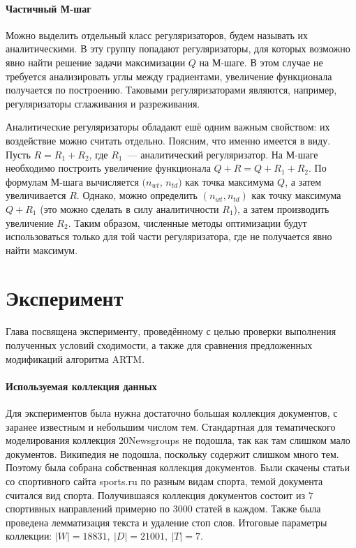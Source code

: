 \documentclass[12pt, twoside]{article}
\begin{document}
\paragraph{Частичный М-шаг}
Можно выделить отдельный класс регуляризаторов, будем называть их аналитическими. В эту группу попадают регуляризаторы, для которых возможно явно найти решение  задачи  максимизации  $Q$ на М-шаге. В этом случае не требуется анализировать углы между градиентами, увеличение функционала получается по построению. Таковыми регуляризаторами являются, например, регуляризаторы сглаживания и разреживания. 

Аналитические регуляризаторы  обладают ешё одним важным свойством: их воздействие можно считать отдельно. Поясним, что именно имеется в виду. Пусть $R = R_1 + R_2$, где $R_1$~--- аналитический регуляризатор. На М-шаге необходимо построить увеличение функционала $Q + R = Q +  R_1 +  R_2$. По формулам М-шага вычисляется $(n_{wt}$, $n_{td})$ как точка максимума $Q$, а затем увеличивается $R$.  Однако, можно определить $(n_{wt},n_{td})$ как точку максимума $Q + R_1 $ (это можно сделать в силу аналитичности $R_1$), а затем производить увеличение $R_2$. Таким образом,  численные методы оптимизации будут использоваться только для той части регуляризатора, где не получается явно найти максимум.

\section{Эксперимент}
Глава посвящена эксперименту, проведённому с целью проверки выполнения полученных условий сходимости, а также для сравнения предложенных модификаций алгоритма ARTM.
\paragraph{Используемая коллекция данных}
Для экспериментов была нужна достаточно большая коллекция документов, с заранее известным  и небольшим числом тем. Стандартная для тематического моделирования  коллекция 20Newsgroups не подошла, так как там слишком мало документов. Википедия не подошла, поскольку содержит слишком много тем. Поэтому была собрана собственная коллекция документов. Были скачены статьи со спортивного сайта sports.ru по разным видам спорта, темой документа считался вид спорта. Получившаяся коллекция документов состоит из 7 спортивных направлений примерно по 3000 статей в каждом. Также была проведена лемматизация текста и удаление стоп слов. Итоговые параметры коллекции: $|W| = 18831,~|D| = 21001,~|T| = 7$.
\end{document}
